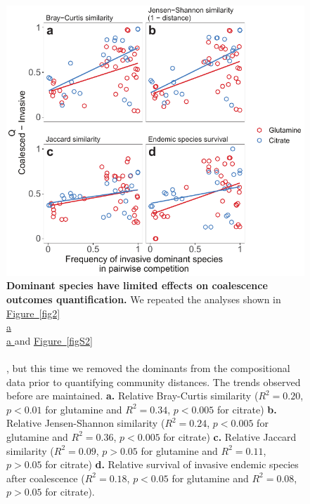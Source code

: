 \documentclass[a4paper,10pt]{article}
\newcommand{\figref}[2][]{%
  \hyperref[{#2}]{%
    Figure~\ref*{#2}%
    \ifx\\#1\\%
    \else
      #1%
    \fi
  }%
}
\begin{document}
\begin{figure}[!h]
\centering
\internallinenumbers
\includegraphics[scale=0.9,keepaspectratio]{figs/figS3.pdf}
\caption{\textbf{Dominant species have limited effects on coalescence outcomes quantification.}
We repeated the analyses shown in \figref[a]{fig2} and \figref{figS2}, but this time we removed the
dominants from the compositional data prior to quantifying community distances.
The trends observed before are maintained.
\textbf{a.} Relative Bray-Curtis similarity
($R^2=0.20$, $p<0.01$ for glutamine and $R^2=0.34$, $p<0.005$ for citrate)
\textbf{b.} Relative Jensen-Shannon similarity 
($R^2=0.24$, $p<0.005$ for glutamine and $R^2=0.36$, $p<0.005$ for citrate)
\textbf{c.} Relative Jaccard similarity
($R^2=0.09$, $p>0.05$ for glutamine and $R^2=0.11$, $p>0.05$ for citrate)
\textbf{d.} Relative survival of invasive endemic species after coalescence
($R^2=0.18$, $p<0.05$ for glutamine and $R^2=0.08$, $p>0.05$ for citrate).}
\label{figS3}
\end{figure}

\clearpage
\end{document}
